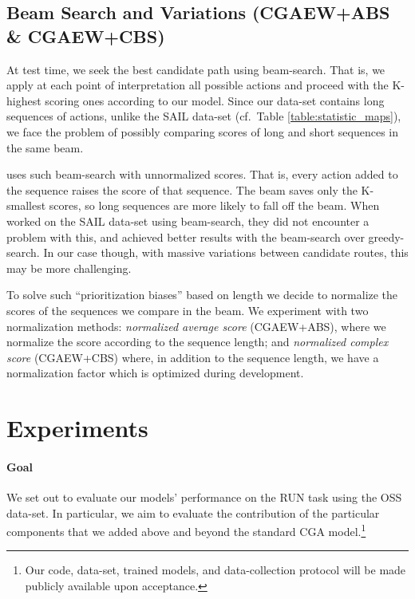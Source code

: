 \documentclass[11pt,a4paper]{article}
\begin{document}
\subsection{Beam Search and Variations (CGAEW+ABS \& CGAEW+CBS)}
At test time, we seek the best candidate path using beam-search. That is, we apply at each point of interpretation all possible actions and proceed with the K-highest scoring ones according to our model.
Since our data-set contains long sequences of actions, unlike the SAIL data-set (cf.\ Table \ref{table:statistic_maps}), we face the problem of possibly comparing scores of long  and short sequences in the same beam.

\citet{mei2015listen} uses such beam-search with unnormalized scores. That is, every action added to the sequence raises the score of that sequence. The beam saves only the K-smallest scores, so long sequences are more likely to fall off the beam.
When \citet{mei2015listen} worked on the SAIL data-set using beam-search, they did not encounter a problem with this, and achieved better results with the beam-search over greedy-search. In our case though, with massive variations between candidate routes, this may be more challenging.

To solve such \enquote{prioritization biases} based on length we decide to normalize the scores of the sequences we compare in the beam.  We experiment with two normalization methods: {\em normalized average score} (CGAEW+ABS), where we normalize the score according to the sequence length; and {\em normalized complex score} (CGAEW+CBS) \citep{wu2016google} where, in addition to the sequence length, we have a normalization factor which is optimized during development. 



\section{Experiments}
\label{expirement}
\paragraph{Goal}We set out to evaluate our models' performance on the RUN task using the OSS data-set. In particular, we aim to evaluate the  contribution of the particular components that we added above and beyond the standard CGA model.\footnote{Our code, data-set, trained models, and data-collection protocol will be made publicly available upon acceptance.} 
\end{document}

